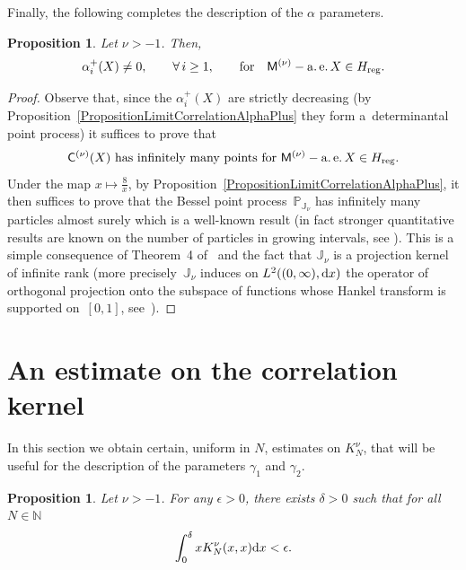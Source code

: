 \documentclass[pdftex]{sigma}
\numberwithin{equation}{section}
\newtheorem{Proposition}[Theorem]{Proposition}
{ \theoremstyle{definition}
\newtheorem{Definition}[Theorem]{Definition}
\newtheorem{Remark}[Theorem]{Remark} }
\begin{document}
Finally, the following completes the description of the $\alpha$ parameters.

\begin{Proposition}\label{PropositionAlphaPlus} Let $\nu>-1$. Then,
\begin{gather*}
\alpha_i^+(X)\neq 0, \qquad \forall\, i\ge 1, \qquad \text{for}\quad \mathsf{M}^{(\nu)}-\operatorname{a.e.} X \in H_{{\rm reg}}.
\end{gather*}
\end{Proposition}

\begin{proof}Observe that, since the $\alpha_i^+(X)$ are strictly decreasing (by Proposition~\ref{PropositionLimitCorrelationAlphaPlus} they form a~determinantal point process) it suffices to prove that
\begin{gather*}
\mathsf{C}^{(\nu)}(X)\  \text{has infinitely many points for} \ \mathsf{M}^{(\nu)}-\operatorname{a.e.} X \in H_{{\rm reg}}.
\end{gather*}
Under the map $x \mapsto \frac{8}{x}$, by Proposition~\ref{PropositionLimitCorrelationAlphaPlus}, it then suffices to prove that the Bessel point process~$\mathbb{P}_{\mathbb{J}_{\nu}}$ has infinitely many particles almost surely which is a well-known result (in fact stronger quantitative results are known on the number of particles in growing intervals, see \cite[Theorem~2]{SoshnikovGaussianFluctuations}). This is a simple consequence of Theorem~4 of~\cite{Soshnikov} and the fact that $\mathbb{J}_{\nu}$ is a projection kernel of infinite rank (more precisely~$\mathbb{J}_{\nu}$ induces on $L^2 ((0,\infty),{\rm d}x )$ the operator of orthogonal projection onto the subspace of functions whose Hankel transform is supported on~$[0,1]$, see~\cite{TracyWidom}).
\end{proof}

\section{An estimate on the correlation kernel}\label{section5}
In this section we obtain certain, uniform in $N$, estimates on $K_N^{\nu}$, that will be useful for the description of the parameters $\gamma_1$ and $\gamma_2$.

\begin{Proposition}\label{EstimateGamma1}
Let $\nu>-1$. For any $\epsilon>0$, there exists $\delta>0$ such that for all $N \in \mathbb{N}$
\begin{gather*}
\int_{0}^{\delta}xK^{\nu}_N(x,x){\rm d}x<\epsilon.
\end{gather*}
\end{Proposition}
\end{document}

